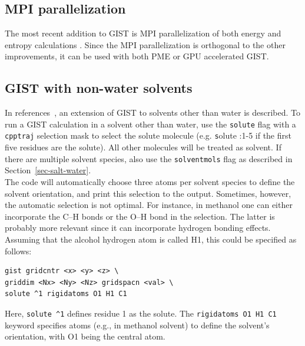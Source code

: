 \documentclass[9pt,tutorial,pubversion]{livecoms}
\newcommand{\software}{\texttt}
\newcommand\inlinecode{\texttt}
\begin{document}
\subsection{MPI parallelization}
The most recent addition to GIST is MPI parallelization of both energy and entropy calculations \cite{Roe2023-mpi-gist}.
Since the MPI parallelization is orthogonal to the other improvements, it can be used with both PME or GPU accelerated GIST.
\subsection{GIST with non-water solvents}
In references~\cite{Kraml2020,Kamenik2020-gist-macrocycles,Waibl2022-gist-solvents}, an extension of GIST to solvents other than water is described.
To run a GIST calculation in a solvent other than water, use the \inlinecode{solute} flag with a \software{cpptraj} selection mask to select the solute molecule (e.g. \inlinecode solute :1-5 if the first five residues are the solute).
All other molecules will be treated as solvent.
If there are multiple solvent species, also use the \inlinecode{solventmols} flag as described in Section~\ref{sec-salt-water}. \\
The code will automatically choose three atoms per solvent species to define the solvent orientation, and print this selection to the output.
Sometimes, however, the automatic selection is not optimal.
For instance, in methanol one can either incorporate the C--H bonds or the O--H bond in the selection.
The latter is probably more relevant since it can incorporate hydrogen bonding effects.
Assuming that the alcohol hydrogen atom is called H1, this could be specified as follows:

\begin{lstlisting}[style=cpptraj]
gist gridcntr <x> <y> <z> \
griddim <Nx> <Ny> <Nz> gridspacn <val> \
solute ^1 rigidatoms O1 H1 C1
\end{lstlisting}
Here, \inlinecode{solute \^{}1} defines residue 1 as the solute. 
The \inlinecode{rigidatoms O1 H1 C1} keyword specifies atoms (e.g., in methanol solvent) to define the solvent's orientation, with O1 being the central atom.
\end{document}
